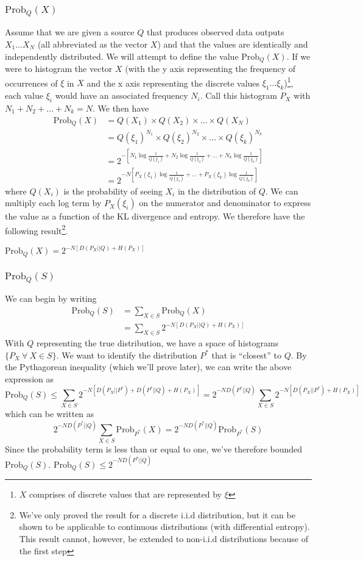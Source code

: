 \documentclass[11pt]{article}
\theoremstyle{definition}
\begin{document}
\subsubsection{$\text{Prob}_Q(X)$}
Assume that we are given a source $Q$ that produces observed data outputs $X_1 \dots X_N$ (all abbreviated as the vector $X$) and that the values are identically and independently distributed. We will attempt to define the value $\text{Prob}_Q(X)$. If we were to histogram the vector $X$ (with the y axis representing the frequency of occurrences of $\xi$ in $X$ and the x axis representing the discrete values $\xi_1 \dots \xi_k$)\footnote{$X$ comprises of discrete values that are represented by $\xi$}, each value $\xi_i$ would have an associated frequency $N_i$. Call this histogram $P_X$ with $N_1 + N_2 + \dots + N_k = N$. We then have 
\begin{align*}
\text{Prob}_Q(X) &= Q(X_1) \times Q(X_2) \times \dots \times Q(X_N) \\
	&= Q(\xi_1)^{N_1} \times Q(\xi_2)^{N_2} \times \dots \times Q(\xi_k)^{N_k} \\
	&= 2^{-[N_1 \log \frac{1}{Q(\xi_1)} + N_2 \log \frac{1}{Q(\xi_2)} + \dots + N_k \log \frac{1}{Q(\xi_k)}]} \\
	&= 2^{-N[P_X(\xi_1) \log \frac{1}{Q(\xi_1)} + \dots + P_X(\xi_k) \log \frac{1}{Q(\xi_k)}]} 
\end{align*}
where $Q(X_i)$ is the probability of seeing $X_i$ in the distribution of $Q$. We can multiply each log term by $P_X(\xi_i)$ on the numerator and denominator to express the value as a function of the KL divergence and entropy. We therefore have the following result\footnote{We've only proved the result for a discrete i.i.d distribution, but it can be shown to be applicable to continuous distributions (with differential entropy). This result cannot, however, be extended to non-i.i.d distributions because of the first step}.

\theorem $\text{Prob}_Q(X) = 2^{-N[D(P_X || Q) + H(P_X)]}$

\subsubsection{$\text{Prob}_Q(S)$}

We can begin by writing 
\begin{align*}
\text{Prob}_Q(S) &= \sum_{X \in S} \text{Prob}_Q(X) \\
	&= \sum_{X \in S} 2^{-N[D(P_X || Q) + H(P_X)]}
\end{align*}
With $Q$ representing the true distribution, we have a space of histograms $\{P_X \: \forall \:  X \in S\}$. We want to identify the distribution $P^*$ that is ``closest'' to $Q$. By the Pythagorean inequality (which we'll prove later), we can write the above expression as
$$\text{Prob}_Q(S) \leq \sum_{X \in S} 2^{-N[D(P_X || P^*) + D(P^* || Q) + H(P_X)]}  = 2^{-ND(P^* || Q)} \sum_{X \in S} 2^{-N[D(P_X || P^*) + H(P_X)]}$$which can be written as $$2^{-ND(P^*||Q)} \sum_{X \in S} \text{Prob}_{P^*}(X) = 2^{-ND(P^*||Q)} \text{Prob}_{P^*}(S)$$Since the probability term is less than or equal to one, we've therefore bounded $\text{Prob}_Q(S)$.
  $\text{Prob}_Q(S) \leq 2^{-ND(P^*||Q)}$
\end{document}
